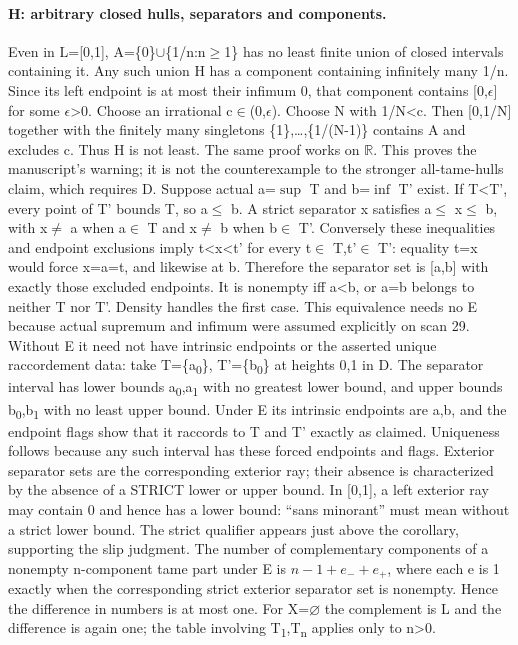 \paragraph{H: arbitrary closed hulls, separators and components.}\label{lem:hulls}
Even in L=[0,1], A=\{0\}$\cup$\{1/n:n$\geq$1\} has no least finite union of closed intervals containing it. Any such union H has a component containing infinitely many 1/n. Since its left endpoint is at most their infimum 0, that component contains [0,$\epsilon$] for some $\epsilon$>0. Choose an irrational c$\in$(0,$\epsilon$). Choose N with 1/N<c. Then [0,1/N] together with the finitely many singletons \{1\},\ldots,\{1/(N-1)\} contains A and excludes c. Thus H is not least. The same proof works on $\mathbb R$. This proves the manuscript's warning; it is not the counterexample to the stronger all-tame-hulls claim, which requires D.
Suppose actual a=$\sup$ T and b=$\inf$ T' exist. If T<T', every point of T' bounds T, so a$\leq$ b. A strict separator x satisfies a$\leq$ x$\leq$ b, with x$\ne$ a when a$\in$ T and x$\ne$ b when b$\in$ T'. Conversely these inequalities and endpoint exclusions imply t<x<t' for every t$\in$ T,t'$\in$ T': equality t=x would force x=a=t, and likewise at b. Therefore the separator set is [a,b] with exactly those excluded endpoints. It is nonempty iff a<b, or a=b belongs to neither T nor T'. Density handles the first case. This equivalence needs no E because actual supremum and infimum were assumed explicitly on scan 29.
Without E it need not have intrinsic endpoints or the asserted unique raccordement data: take T=\{a\textsubscript{0}\}, T'=\{b\textsubscript{0}\} at heights 0,1 in D. The separator interval has lower bounds a\textsubscript{0},a\textsubscript{1} with no greatest lower bound, and upper bounds b\textsubscript{0},b\textsubscript{1} with no least upper bound. Under E its intrinsic endpoints are a,b, and the endpoint flags show that it raccords to T and T' exactly as claimed. Uniqueness follows because any such interval has these forced endpoints and flags. Exterior separator sets are the corresponding exterior ray; their absence is characterized by the absence of a STRICT lower or upper bound. In [0,1], a left exterior ray may contain 0 and hence has a lower bound: ``sans minorant'' must mean without a strict lower bound. The strict qualifier appears just above the corollary, supporting the slip judgment.
The number of complementary components of a nonempty n-component tame part under E is $n-1+e_-+e_+$, where each e is 1 exactly when the corresponding strict exterior separator set is nonempty. Hence the difference in numbers is at most one. For X=$\varnothing$ the complement is L and the difference is again one; the table involving T\textsubscript{1},T\textsubscript{n} applies only to n>0.
